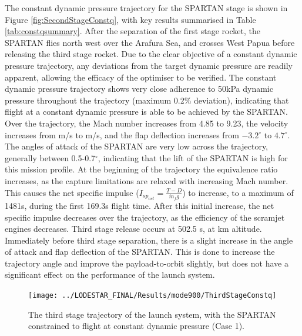 The constant dynamic pressure trajectory for the SPARTAN stage is shown in Figure \ref{fig:SecondStageConstq}, with key results summarised in Table \ref{tab:constqsummary}. After the separation of the first stage rocket, the SPARTAN flies north west over the Arafura Sea, and crosses West Papua before releasing the third stage rocket. Due to the clear objective of a constant dynamic pressure trajectory, any deviations from the target dynamic pressure are readily apparent, allowing the efficacy of the optimiser to be verified. 
The constant dynamic pressure trajectory shows very close adherence to 50kPa dynamic pressure  throughout the trajectory (maximum 0.2\% deviation), indicating that flight at a constant dynamic pressure is able to be achieved by the SPARTAN.  
Over the trajectory, the Mach number increases from 4.85 to 9.23, the velocity increases from \firstsecondSeparationvConstqNoReturn m/s to \secondthirdSeparationvConstqNoReturn m/s, and the flap deflection increases from $-3.2^\circ$ to $4.7^\circ$. The angles of attack of the SPARTAN are very low across the trajectory, generally between 0.5-0.7$^\circ$, indicating that the lift of the SPARTAN is high for this mission profile. At the beginning of the trajectory the equivalence ratio increases, as the capture limitations are relaxed with increasing Mach number. This causes the net specific impulse ($I_{sp_{net}} = \frac{T-D}{\dot{m}_f g}$) to increase, to a maximum of 1481s, during the first 169.3s flight time.  After this initial increase, the net specific impulse decreases over the trajectory, as the efficiency of the scramjet engines decreases. 
Third stage release occurs at 502.5 s, at \secondthirdSeparationAltConstqNoReturn km altitude. Immediately before third stage separation, there is a slight increase in the angle of attack and flap deflection of the SPARTAN. This is done to increase the trajectory angle and improve the payload-to-orbit slightly, but does not have a significant effect on the performance of the launch system. 

\begin{figure}[ht!]
\centering
\texttt{[image: ../LODESTAR\_FINAL/Results/mode900/ThirdStageConstq]}
\caption{The third stage trajectory of the launch system, with the SPARTAN constrained to flight at constant dynamic pressure (Case 1).}
\label{fig:ThirdStageConstq}
\end{figure}

